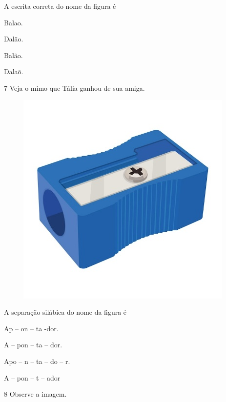 
A escrita correta do nome da figura é

\begin{escolha}
\item Balao.

\item Dalão.

\item Balão.

\item Dalaõ.
\end{escolha}

\pagebreak
\num{7} Veja o mimo que Tália ganhou de sua amiga.

\begin{figure}[htpb!]
\centering
\includegraphics[width=.3\textwidth]{media/image168.jpeg}
\end{figure}


A separação silábica do nome da figura é

\begin{multicols}{2}
\begin{escolha}
\item Ap -- on -- ta -dor.

\item A -- pon -- ta -- dor.

\item Apo -- n -- ta -- do -- r.

\item A -- pon -- t -- ador
\end{escolha}
\end{multicols}

\num{8} Observe a imagem.

